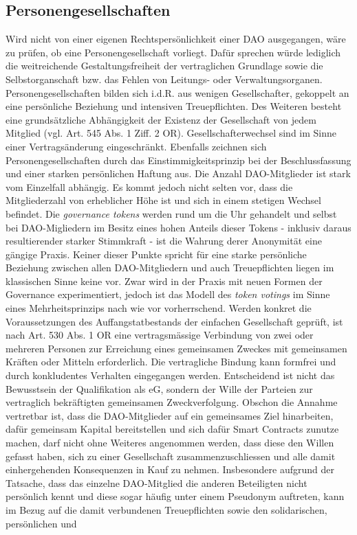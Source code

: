 \documentclass[a4paper,12pt]{report}
\begin{document}
	\subsection{Personengesellschaften}
	\startsubsection
	Wird nicht von einer eigenen Rechtspersönlichkeit einer DAO ausgegangen, wäre zu prüfen, ob eine Personengesellschaft vorliegt. Dafür sprechen würde lediglich die weitreichende Gestaltungsfreiheit der vertraglichen Grundlage sowie die Selbstorganschaft bzw. das Fehlen von Leitungs- oder Verwaltungsorganen. Personengesellschaften bilden sich i.d.R. aus wenigen Gesellschafter, gekoppelt an eine persönliche Beziehung und intensiven Treuepflichten. Des Weiteren besteht eine grundsätzliche Abhängigkeit der Existenz der Gesellschaft von jedem Mitglied (vgl. Art. 545 Abs. 1 Ziff. 2 OR). Gesellschafterwechsel sind im Sinne einer Vertragsänderung eingeschränkt. Ebenfalls zeichnen sich Personengesellschaften durch das Einstimmigkeitsprinzip bei der Beschlussfassung und einer starken persönlichen Haftung aus. Die Anzahl DAO-Mitglieder ist stark vom Einzelfall abhängig. Es kommt jedoch nicht selten vor, dass die Mitgliederzahl von erheblicher Höhe ist und sich in einem stetigen Wechsel befindet. Die \textit{governance tokens} werden rund um die Uhr gehandelt und selbst bei DAO-Migliedern im Besitz eines hohen Anteils dieser Tokens - inklusiv daraus resultierender starker Stimmkraft - ist die Wahrung derer Anonymität eine gängige Praxis. Keiner dieser Punkte spricht für eine starke persönliche Beziehung zwischen allen DAO-Mitgliedern und auch Treuepflichten liegen im klassischen Sinne keine vor. Zwar wird in der Praxis mit neuen Formen der Governance experimentiert, jedoch ist das Modell des \textit{token votings} im Sinne eines Mehrheitsprinzips nach wie vor vorherrschend. Werden konkret die Voraussetzungen des Auffangstatbestands der einfachen Gesellschaft geprüft, ist nach Art. 530 Abs. 1 OR eine vertragsmässige Verbindung von zwei oder mehreren Personen zur Erreichung eines gemeinsamen Zweckes mit gemeinsamen Kräften oder Mitteln erforderlich. Die vertragliche Bindung kann formfrei und durch konkludentes Verhalten eingegangen werden. Entscheidend ist nicht das Bewusstsein der Qualifikation als eG, sondern der Wille der Parteien zur vertraglich bekräftigten gemeinsamen Zweckverfolgung. Obschon die Annahme vertretbar ist, dass die DAO-Mitglieder auf ein gemeinsames Ziel hinarbeiten, dafür gemeinsam Kapital bereitstellen und sich dafür Smart Contracts zunutze machen, darf nicht ohne Weiteres angenommen werden, dass diese den Willen gefasst haben, sich zu einer Gesellschaft zusammenzuschliessen und alle damit einhergehenden Konsequenzen in Kauf zu nehmen. Insbesondere aufgrund der Tatsache, dass das einzelne DAO-Mitglied die anderen Beteiligten nicht persönlich kennt und diese sogar häufig unter einem Pseudonym auftreten, kann im Bezug auf die damit verbundenen Treuepflichten sowie den solidarischen, persönlichen und 
\end{document}
